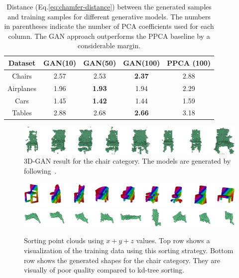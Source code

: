 \begin{table}[t]
\centering
\begin{tabular}{c|ccc|c}
Dataset & GAN(10) & GAN(50) &	GAN(100) &	PPCA (100) \\
\hline
Chairs	& 2.57	& 2.53	& \textbf{2.37}	& 2.88 \\
Airplanes	& 1.96	& \textbf{1.93}	& 1.94	& 2.29 \\
Cars	& 1.45	& \textbf{1.42}	& 1.44	& 1.59 \\
Tables	& 2.88	& 2.68	& \textbf{2.66}	& 3.18 \\
\end{tabular}
\caption{\small \label{tab:quant} Distance (Eq.\ref{eq:chamfer-distance}) between the generated samples and training samples for different generative models. The numbers in parentheses indicate the number of PCA coefficients used for each column. The GAN approach outperforms the PPCA baseline by a considerable margin.}
\vspace{-6pt}
\end{table}

\begin{figure}[t]
\includegraphics[width=1.0\linewidth]{PCAGAN/images/3DGAN_batch1row.png}
\vspace{-16pt}
\caption{\small \label{fig:3dgan} 3D-GAN result for the chair category. The models are generated by following~\cite{wu2016learning}.}
\vspace{-12pt}
\end{figure}

\begin{figure}[t]
\centering
\includegraphics[width=0.8\linewidth]{PCAGAN/images/chairs_xyz_data.png}
\includegraphics[width=0.8\linewidth]{PCAGAN/images/chairs_xyz_generated.png}
\vspace{-8pt}
\caption{\small \label{fig:chairsxyz} Sorting point clouds using $x+y+z$ values. Top row shows a visualization of the training data using this sorting strategy.
	Bottom row shows the generated shapes for the chair category. They are visually of poor quality compared to kd-tree sorting.}
\vspace{-6pt}	
\end{figure}

